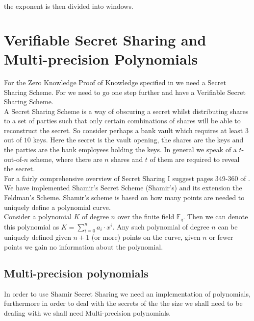 \documentclass[ %
                    author={Nicholas Tutte},
                supervisor={Prof. Nigel Smart},
                    degree={MEng},
                     title={Secure Two Party Computation},
                  subtitle={A practical comparison of recent protocols},
                      type={Research - GG1K},
                      year={2015} ]{dissertation}
\begin{document}
				the exponent is then divided into windows.


		\section{Verifiable Secret Sharing and Multi-precision Polynomials}

			For the Zero Knowledge Proof of Knowledge specified in \cite{LindellAndPinkas2011} we need a Secret Sharing Scheme. For \cite{Katz_Symm_CnC_2013} we need to go one step further and have a Verifiable Secret Sharing Scheme.\\

			A Secret Sharing Scheme is a way of obscuring a secret whilst distributing shares to a set of parties such that only certain combinations of shares will be able to reconstruct the secret. So consider perhaps a bank vault which requires at least $3$ out of $10$ keys. Here the secret is the vault opening, the shares are the keys and the parties are the bank employees holding the keys. In general we speak of a $t$-out-of-$n$ scheme, where there are $n$ shares and $t$ of them are required to reveal the secret.\\

			For a fairly comprehensive overview of Secret Sharing I suggest pages 349-360 of \cite{NigelCryptoBook}.\\

			We have implemented Shamir's Secret Scheme (Shamir's) and its extension the Feldman's Scheme. Shamir's scheme is based on how many points are needed to uniquely define a polynomial curve.\\

			Consider a polynomial $K$ of degree $n$ over the finite field $\mathbb{F}_q$. Then we can denote this polynomial as $K = \sum_{i=0}^{n} a_i \cdot x ^ i$. Any such polynomial of degree $n$ can be uniquely defined given $n+1$ (or more) points on the curve, given $n$ or fewer points we gain no information about the polynomial.

			\subsection{Multi-precision polynomials}
				In order to use Shamir Secret Sharing we need an implementation of polynomials, furthermore in order to deal with the secrets of the the size we shall need to be dealing with we shall need Multi-precision polynomials.\\
				
\end{document}
